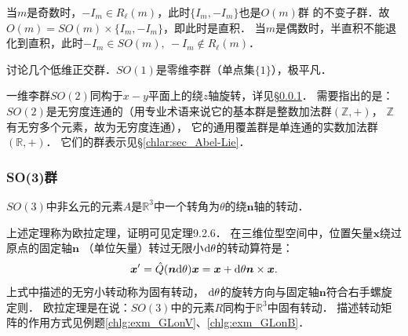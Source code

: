 当$m$是奇数时，$-I_m \in R_{\ell}(m)$，此时$\{I_m, -I_m\}$也是$O(m)$群
的不变子群．故
$O(m)=SO(m)\times \{I_m, -I_m\}$，即此时是直积．
当$m$是偶数时，半直积不能退化到直积，此时$-I_m \in SO(m), \  -I_m \notin R_{\ell}(m)$．







讨论几个低维正交群．$SO(1)$是零维李群（单点集$\{1\}$），极平凡．


一维李群$SO(2)$同构于$x-y$平面上的绕$z$轴旋转，详见\S\ref{chlg:sec_rotation}．
需要指出的是：$SO(2)$是无穷度连通的（用专业术语来说它的基本群是整数加法群$(\mathbb{Z},+)$，
$\mathbb{Z}$有无穷多个元素，故为无穷度连通），
它的通用覆盖群是单连通的实数加法群$(\mathbb{R},+)$．
它们的群表示见\S\ref{chlar:sec_Abel-Lie}．



\subsubsection{SO(3)群}\label{chlg:sec_rotation}

\begin{theorem}\label{chlg:thm_Euler}
    $SO(3)$中非幺元的元素$A$是$\mathbb{R}^3$中一个转角为$\theta$的绕$\boldsymbol{n}$轴的转动．
\end{theorem}
上述定理称为欧拉定理，证明可见\parencite{marsden-1999-IMS}定理9.2.6．
在三维位型空间中，位置矢量$\boldsymbol{x}$绕过原点的固定轴$\boldsymbol{n}$
（单位矢量）转过无限小${\rm d}\theta$的转动算符是：
\begin{equation}\label{chlg:eqn_rot-inf}
    \boldsymbol{x}' = \hat{Q}(\boldsymbol{n}{\rm d}\theta) \boldsymbol{x} 
    = \boldsymbol{x} +  {\rm d}\theta\boldsymbol{n}\times \boldsymbol{x} .
\end{equation}
上式中描述的无穷小转动称为{\heiti 固有转动}，
${\rm d}\theta$的旋转方向与固定轴$\boldsymbol{n}$符合右手螺旋定则．
欧拉定理是在说：$SO(3)$中的元素$R$同构于$\mathbb{R}^3$中固有转动．
描述转动矩阵的作用方式见例题\ref{chlg:exm_GLonV}、\ref{chlg:exm_GLonB}．


